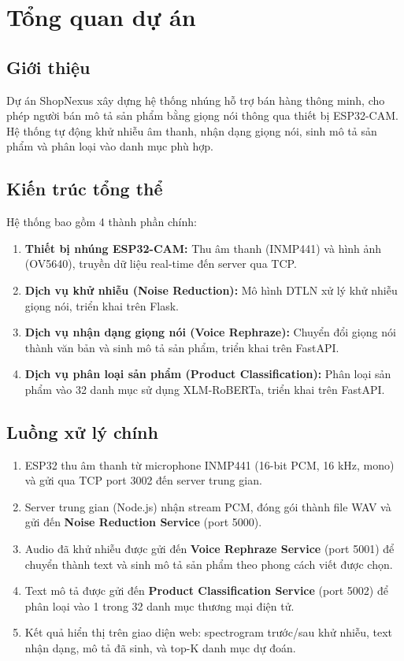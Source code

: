 \chapter{Tổng quan dự án}

\section{Giới thiệu}

Dự án ShopNexus xây dựng hệ thống nhúng hỗ trợ bán hàng thông minh, cho phép
người bán mô tả sản phẩm bằng giọng nói thông qua thiết bị ESP32-CAM. Hệ thống
tự động khử nhiễu âm thanh, nhận dạng giọng nói, sinh mô tả sản phẩm và phân loại
vào danh mục phù hợp.

\section{Kiến trúc tổng thể}

Hệ thống bao gồm 4 thành phần chính:

\begin{enumerate}
\item \textbf{Thiết bị nhúng ESP32-CAM:} Thu âm thanh (INMP441) và hình ảnh (OV5640),
  truyền dữ liệu real-time đến server qua TCP.
\item \textbf{Dịch vụ khử nhiễu (Noise Reduction):} Mô hình DTLN xử lý khử nhiễu
  giọng nói, triển khai trên Flask.
\item \textbf{Dịch vụ nhận dạng giọng nói (Voice Rephraze):} Chuyển đổi giọng nói
  thành văn bản và sinh mô tả sản phẩm, triển khai trên FastAPI.
\item \textbf{Dịch vụ phân loại sản phẩm (Product Classification):} Phân loại sản phẩm
  vào 32 danh mục sử dụng XLM-RoBERTa, triển khai trên FastAPI.
\end{enumerate}

\section{Luồng xử lý chính}

\begin{enumerate}
\item ESP32 thu âm thanh từ microphone INMP441 (16-bit PCM, 16 kHz, mono) và gửi
  qua TCP port 3002 đến server trung gian.
\item Server trung gian (Node.js) nhận stream PCM, đóng gói thành file WAV và gửi
  đến \textbf{Noise Reduction Service} (port 5000).
\item Audio đã khử nhiễu được gửi đến \textbf{Voice Rephraze Service} (port 5001)
  để chuyển thành text và sinh mô tả sản phẩm theo phong cách viết được chọn.
\item Text mô tả được gửi đến \textbf{Product Classification Service} (port 5002)
  để phân loại vào 1 trong 32 danh mục thương mại điện tử.
\item Kết quả hiển thị trên giao diện web: spectrogram trước/sau khử nhiễu,
  text nhận dạng, mô tả đã sinh, và top-K danh mục dự đoán.
\end{enumerate}

